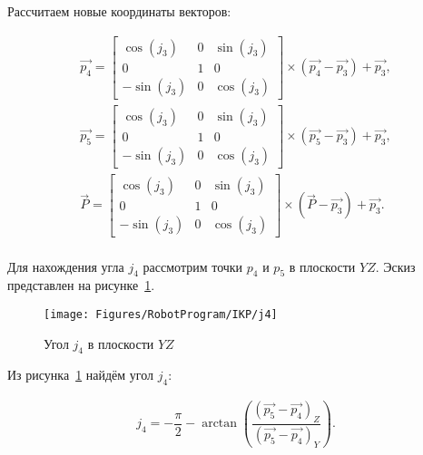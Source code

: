 Рассчитаем новые координаты векторов:

\begin{gather*}
    \overrightarrow{p_4} =
    \begin{bmatrix}
        \cos(j_3)  & 0 & \sin(j_3) \\
        0          & 1 & 0         \\
        -\sin(j_3) & 0 & \cos(j_3)
    \end{bmatrix} \times \left( \overrightarrow{p_4} - \overrightarrow{p_3} \right) + \overrightarrow{p_3}, \\
    \overrightarrow{p_5} =
    \begin{bmatrix}
        \cos(j_3)  & 0 & \sin(j_3) \\
        0          & 1 & 0         \\
        -\sin(j_3) & 0 & \cos(j_3)
    \end{bmatrix} \times \left( \overrightarrow{p_5} - \overrightarrow{p_3} \right) + \overrightarrow{p_3}, \\
    \overrightarrow{P} =
    \begin{bmatrix}
        \cos(j_3)  & 0 & \sin(j_3) \\
        0          & 1 & 0         \\
        -\sin(j_3) & 0 & \cos(j_3)
    \end{bmatrix} \times \left( \overrightarrow{P} - \overrightarrow{p_3} \right) + \overrightarrow{p_3}.
\end{gather*} \\

Для нахождения угла $j_4$ рассмотрим точки $p_4$ и $p_5$ в плоскости $YZ$.
Эскиз представлен на рисунке~\ref{fig:RobotProgram:IKP:j4}.

\begin{figure}[H]
    \centering
    \vspace{14pt}
    \texttt{[image: Figures/RobotProgram/IKP/j4]}
    \caption{Угол $j_4$ в плоскости $YZ$}
    \label{fig:RobotProgram:IKP:j4}
\end{figure}

Из рисунка~\ref{fig:RobotProgram:IKP:j4} найдём угол $j_4$:

\begin{gather*}
    j_4 = -\dfrac{\pi}{2} - \arctan \left( \dfrac
    {\left( \overrightarrow{p_5} - \overrightarrow{p_4} \right)_Z}
    {\left( \overrightarrow{p_5} - \overrightarrow{p_4} \right)_Y} \right).
\end{gather*} \\

